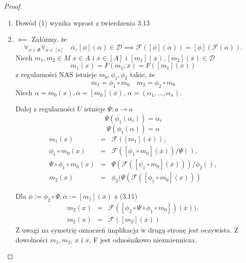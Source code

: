 \documentclass[12pt,a4paper]{report}
\newcommand{\domkniecie}[1]{\left\lbrack{#1}\right\rbrack}
\begin{document}
\begin{proof} 
\begin{enumerate}
\item
Dowód (1) wynika wprost z twierdzenia 3.13
\item
$\impliedby$
Załóżmy, że 
\begin{equation}
\forall_{\phi \in \Phi} \forall_{\overline{\alpha} \in \domkniecie{a}} \quad \overline{\alpha}, \domkniecie{\phi}(\overline{\alpha}) \in \mathcal{D} \implies \mathcal{F}(\domkniecie{\phi}(\overline{\alpha}))=\domkniecie{\phi}(\mathcal{F}(\overline{\alpha})).
\end{equation}
Niech $m_1, m_2 \in M$ $x \in A$ i $\overline{x} \in \domkniecie{A}$ i $\domkniecie{m_1}(\overline{x}), \domkniecie{m_2}(\overline{x}) \in \mathcal{D}$
$$
m_1(x)=F(m_1;\overline{x})=F(\domkniecie{m_1}(\overline{x}))
$$
 z regularności NAS istnieje $m_0, \phi_1 , \phi_2$ takie, że 
$$ 
m_1=\phi_1\circ m_0 \quad m_2=\phi_2\circ m_0
$$
Niech $\alpha=m_0(x), \overline{\alpha}=\domkniecie{m_0}(\overline{x})$, $\alpha=(\alpha_1,\dots,\alpha_n)$.

Dalej z regularności $U$ istnieje $\Psi:a \to a$
$$
 \Psi(\phi_1(\overline{\alpha_i}))=\overline{\alpha_i}
$$
$$
 \Psi(\phi_1(\alpha))=\alpha
$$
\begin{eqnarray*}
m_1(x) & = & \mathcal{F}(\domkniecie{m_1}(\overline{x})),\\ 
\phi_1 \circ m_0(x)& = & \mathcal{F}(\domkniecie{\phi_1 \circ m_0}(\overline{x}))/\Psi(),\\ 
\Psi \circ \phi_1 \circ m_0(x)&= & \Psi(\mathcal{F}(\domkniecie{\psi_1 \circ m_0}(\overline{x})))/\phi_2(),\\
m_2(x)&=&\phi_2(\Psi(\mathcal{F}(\domkniecie{\phi_1 \circ m_0}(x)))
\end{eqnarray*}

Dla $\phi:=\phi_2\circ \Psi, \overline{\alpha}:=\domkniecie{m_1}(\overline{x})$ z (3.11)
\begin{eqnarray*}
m_2(x) & = & \mathcal{F}(\domkniecie{\phi_2 \circ \Psi \circ \phi_1 \circ m_0})(\overline{x})),\\
m_2(x) & = & \mathcal{F}(\domkniecie{m_2}(\overline{x}))
\end{eqnarray*}
Z uwagi na symetrię oznaczeń implikacja w drugą stronę jest oczywista. Z dowolności $m_1, m_2$, $x$ i $\overline{x}$, F jest odnośnikowo niezmiennicza.


\end{enumerate}
\end{proof}
\end{document}
